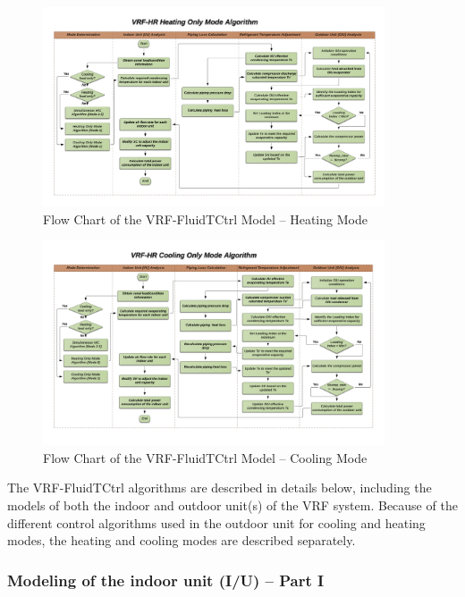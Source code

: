 \begin{figure}[hbtp] %
\centering
\includegraphics[width=0.9\textwidth, height=0.9\textheight, keepaspectratio=true]{media/VRF-FluidTCtrl-3a.png}
\caption{Flow Chart of the VRF-FluidTCtrl Model -- Heating Mode \label{fig:vrf-fluid-t-ctrl-3a}}
\end{figure}

\begin{figure}[hbtp] %
\centering
\includegraphics[width=0.9\textwidth, height=0.9\textheight, keepaspectratio=true]{media/VRF-FluidTCtrl-3b.png}
\caption{Flow Chart of the VRF-FluidTCtrl Model -- Cooling Mode \label{fig:vrf-fluid-t-ctrl-3b}}
\end{figure}

The VRF-FluidTCtrl algorithms are described in details below, including the models of both the indoor and outdoor unit(s) of the VRF system. Because of the different control algorithms used in the outdoor unit for cooling and heating modes, the heating and cooling modes are described separately.

\subsubsection{Modeling of the indoor unit (I/U) -- Part I}\label{modeling-of-the-indoor-unit-iu-part-i}

